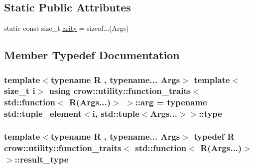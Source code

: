 \subsection*{Static Public Attributes}
\begin{DoxyCompactItemize}
\item 
static const size\-\_\-t \hyperlink{structcrow_1_1utility_1_1function__traits_3_01std_1_1function_3_01_r_07_args_8_8_8_08_4_01_4_a70516b9f70d408ea0bae3b62913c7976}{arity} = sizeof...(Args)
\end{DoxyCompactItemize}


\subsection{Member Typedef Documentation}
\hypertarget{structcrow_1_1utility_1_1function__traits_3_01std_1_1function_3_01_r_07_args_8_8_8_08_4_01_4_a880b9ad766c1a3c6999e60f0fca9f940}{
\subsubsection[{arg}]{\setlength{\rightskip}{0pt plus 5cm}template$<$typename R , typename... Args$>$ template$<$size\-\_\-t i$>$ using {\bf crow\-::utility\-::function\-\_\-traits}$<$ std\-::function$<$ R(Args...)$>$ $>$\-::{\bf arg} =  typename std\-::tuple\-\_\-element$<$i, std\-::tuple$<$Args...$>$$>$\-::type}}\label{structcrow_1_1utility_1_1function__traits_3_01std_1_1function_3_01_r_07_args_8_8_8_08_4_01_4_a880b9ad766c1a3c6999e60f0fca9f940}
\hypertarget{structcrow_1_1utility_1_1function__traits_3_01std_1_1function_3_01_r_07_args_8_8_8_08_4_01_4_a196a60dc8ea498d8e4c09c41df524f09}{
\subsubsection[{result\-\_\-type}]{\setlength{\rightskip}{0pt plus 5cm}template$<$typename R , typename... Args$>$ typedef R {\bf crow\-::utility\-::function\-\_\-traits}$<$ std\-::function$<$ R(Args...)$>$ $>$\-::{\bf result\-\_\-type}}}\label{structcrow_1_1utility_1_1function__traits_3_01std_1_1function_3_01_r_07_args_8_8_8_08_4_01_4_a196a60dc8ea498d8e4c09c41df524f09}


